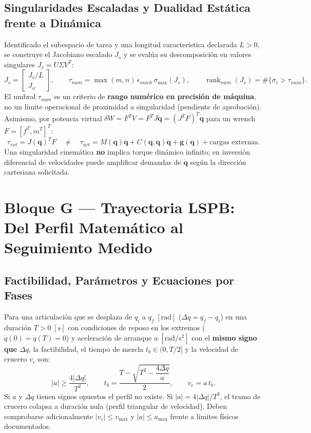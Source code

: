 \documentclass[10pt, a4paper]{article}
\begin{document}
\subsection{Singularidades Escaladas y Dualidad Estática frente a Dinámica}
Identificado el subespacio de tarea y una longitud característica declarada $L > 0$, se construye el Jacobiano escalado $J_s$ y se evalúa su descomposición en valores singulares $J_s = U\Sigma V^T$:
\begin{equation}
    J_s = \begin{bmatrix} J_v / L \\ J_\omega \end{bmatrix}, \qquad
    \tau_{num} = \max(m, n)\,\epsilon_{mach}\,\sigma_{\max}(J_s), \qquad
    \operatorname{rank}_{num}(J_s) = \#\{\sigma_i > \tau_{num}\}.
    \label{eq:svd_rank}
\end{equation}
El umbral $\tau_{num}$ es un criterio de \textbf{rango numérico en precisión de máquina}, no un límite operacional de proximidad a singularidad (pendiente de aprobación). Asimismo, por potencia virtual $\delta W = F^T V = F^T J\dot{\mathbf{q}} = (J^T F)^T\dot{\mathbf{q}}$ para un wrench $F = [f^T, m^T]^T$:
\begin{equation}
    \boxed{ \tau_{ext} = J(\mathbf{q})^T F \quad \neq \quad \tau_{act} = M(\mathbf{q})\ddot{\mathbf{q}} + C(\mathbf{q},\dot{\mathbf{q}})\dot{\mathbf{q}} + \mathbf{g}(\mathbf{q}) + \text{cargas externas} }.
    \label{eq:duality}
\end{equation}
Una singularidad cinemática \textbf{no} implica torque dinámico infinito; en inversión diferencial de velocidades puede amplificar demandas de $\dot{\mathbf{q}}$ según la dirección cartesiana solicitada.

\section{Bloque G — Trayectoria LSPB: Del Perfil Matemático al Seguimiento Medido}

\subsection{Factibilidad, Parámetros y Ecuaciones por Fases}
Para una articulación que se desplaza de $q_i$ a $q_f\;[\mathrm{rad}]$ ($\Delta q = q_f - q_i$) en una duración $T > 0\;[\mathrm{s}]$ con condiciones de reposo en los extremos ($\dot{q}(0) = \dot{q}(T) = 0$) y aceleración de arranque $a\;[\mathrm{rad/s^2}]$ con el \textbf{mismo signo que $\Delta q$}, la factibilidad, el tiempo de mezcla $t_b \in (0, T/2]$ y la velocidad de crucero $v_c$ son:
\begin{equation}
    \boxed{ |a| \ge \frac{4|\Delta q|}{T^2} }, \qquad
    \boxed{ t_b = \frac{T - \sqrt{T^2 - \dfrac{4\Delta q}{a}}}{2} }, \qquad
    \boxed{ v_c = a\,t_b }.
    \label{eq:lspb_params}
\end{equation}
Si $a$ y $\Delta q$ tienen signos opuestos el perfil no existe. Si $|a| = 4|\Delta q|/T^2$, el tramo de crucero colapsa a duración nula (perfil triangular de velocidad). Deben comprobarse adicionalmente $|v_c| \le v_{\max}$ y $|a| \le a_{\max}$ frente a límites físicos documentados.
\end{document}
